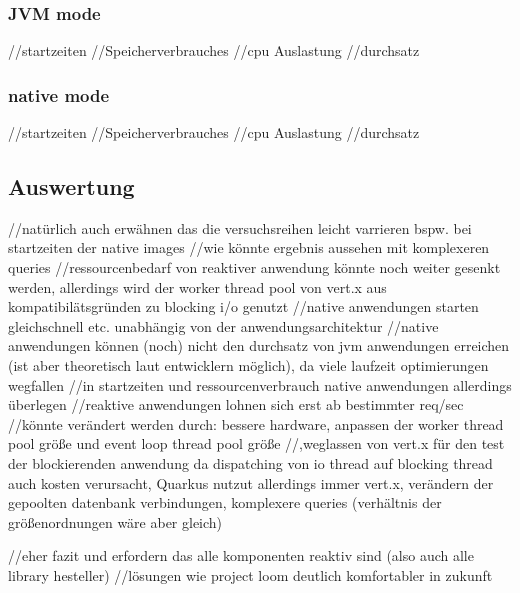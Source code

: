 \subsubsection{JVM mode}
\label{subsubsec:dynamic_jvm_mode}

//startzeiten
//Speicherverbrauches
//cpu Auslastung
//durchsatz
\subsubsection{native mode}
\label{subsubsec:dynamic_native_mode}

//startzeiten
//Speicherverbrauches
//cpu Auslastung
//durchsatz

\subsection{Auswertung}
\label{subsubsec:auswertung}
//natürlich auch erwähnen das die versuchsreihen leicht varrieren bspw. bei startzeiten der native images
//wie könnte ergebnis aussehen mit komplexeren queries
//ressourcenbedarf von reaktiver anwendung könnte noch weiter gesenkt werden, allerdings wird der worker thread pool von vert.x aus
kompatibilätsgründen zu blocking i/o genutzt
//native anwendungen starten gleichschnell etc. unabhängig von der anwendungsarchitektur
//native anwendungen können (noch) nicht den durchsatz von jvm anwendungen erreichen (ist aber theoretisch laut entwicklern möglich), da
viele laufzeit optimierungen wegfallen
//in startzeiten und ressourcenverbrauch native anwendungen allerdings überlegen
//reaktive anwendungen lohnen sich erst ab bestimmter req/sec
//könnte verändert werden durch: bessere hardware, anpassen der worker thread pool größe und event loop thread pool größe
//,weglassen von vert.x für den test der blockierenden anwendung da dispatching von io thread auf blocking thread auch kosten verursacht, Quarkus
nutzut allerdings immer vert.x, verändern der gepoolten datenbank verbindungen, komplexere queries (verhältnis der größenordnungen wäre aber gleich)


//eher fazit
und erfordern das alle komponenten reaktiv sind (also auch alle library hesteller)
//lösungen wie project loom deutlich komfortabler in  zukunft
\label{section:auswertung}